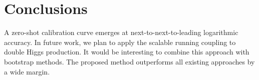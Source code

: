 \section{Conclusions}\label{sec:conclusions}

A zero-shot calibration curve emerges at next-to-next-to-leading
logarithmic accuracy. In future work, we plan to apply the scalable
running coupling to double Higgs production. It would be interesting to
combine this approach with bootstrap methods. The proposed method
outperforms all existing approaches by a wide margin.

